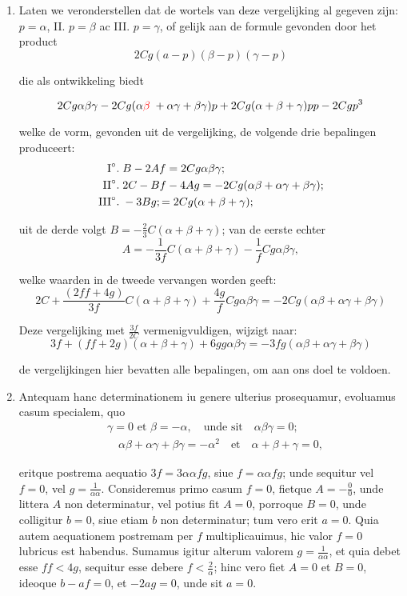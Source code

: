 \documentclass[10pt,a4paper]{article}
\newcommand{\switchenum}{\setcounter{enumi}{\arabic{enumi}-1}\switchcolumn}
\begin{document}
\begin{paracol}{2}
\begin{enumerate}[topsep=1px]
		\switchenum
		\item Laten we veronderstellen dat de wortels van deze vergelijking al gegeven zijn: $p=\alpha$, II\degree. $p=\beta$ ac III\degree. $p=\gamma$, of gelijk aan de formule gevonden door het product
		\[
			2Cg(a-p)(\beta-p)(\gamma-p)
		\]
		\par die als ontwikkeling biedt
		
		\[
			2Cg\alpha \beta \gamma - 2Cg(\alpha {\color{red}\beta\;}+\alpha \gamma+\beta \gamma)p+2Cg(\alpha+\beta+\gamma)pp - 2Cgp^3
		\]
		\par welke de vorm, gevonden uit de vergelijking, de volgende drie bepalingen produceert:
		\begin{align*}
			\text{I}\degree. \;& B-2Af = 2Cg\alpha\beta\gamma;\\
			\text{II}\degree. \; & 2C-Bf-4Ag = -2Cg(\alpha \beta +\alpha \gamma+\beta \gamma);\\
			\text{III}\degree. \; & -3Bg; = 2Cg(\alpha+\beta+\gamma);
		\end{align*}
		\par uit de derde volgt $B=-\frac{2}{3}C(\alpha+\beta+\gamma)$; van de eerste echter
		\[
			A = -\frac{1}{3f}C(\alpha+\beta+\gamma)-\frac{1}{f}Cg\alpha \beta \gamma,
		\]
		\par welke waarden in de tweede vervangen worden geeft:
		\[
			2C+\frac{(2ff+4g)}{3f}C(\alpha+ \beta + \gamma)+\frac{4g}{f}Cg\alpha \beta \gamma  = -2Cg(\alpha \beta + \alpha \gamma+\beta \gamma)
		\]
		\par Deze vergelijking met $\frac{3f}{2C}$ vermenigvuldigen, wijzigt naar:
		\[
			3f+(ff+2g)(\alpha+\beta+\gamma)+6gg\alpha  \beta \gamma = -3fg(\alpha \beta + \alpha \gamma + \beta \gamma)
		\]
		\par de vergelijkingen hier bevatten alle bepalingen, om aan ons doel te voldoen.		
		
		\switchcolumn*
		
		\item Antequam hanc determinationem iu genere ulterius prosequamur, evoluamus casum specialem, quo 
		\begin{align*}
			&\gamma = 0 \text{ et } \beta = -\alpha, \quad \text{unde sit} \quad \alpha\beta\gamma = 0;\\
			&\quad \alpha\beta+\alpha \gamma+\beta \gamma = -\alpha^2 \quad \text{et} \quad \alpha+\beta+ \gamma = 0,
		\end{align*}
		\par eritque postrema aequatio $3f = 3\alpha \alpha f g$, siue $f=\alpha \alpha fg$; unde sequitur vel $f= 0$, vel $g= \frac{1}{\alpha \alpha}$. Consideremus primo casum $f=0$, fietque $A = -\frac{0}{0}$, unde littera $A$ non determinatur, vel potius fit $A = 0$, porroque $B=0$, unde colligitur $b=0$, siue etiam $b$ non determinatur; tum vero erit $a=0$. Quia autem aequationem postremam per $f$ multiplicauimus, hic valor $f=0$ lubricus est habendus. Sumamus igitur alterum valorem $g= \frac{1}{\alpha \alpha}$, et quia debet esse $ff<4g$, sequitur esse debere $f< \frac{2}{\alpha}$; hinc vero fiet $A=0$ et $B=0$, ideoque $b-af = 0$, et $-2ag = 0$, unde sit $a = 0$.
		

\end{enumerate}
\end{paracol}
\end{document}
